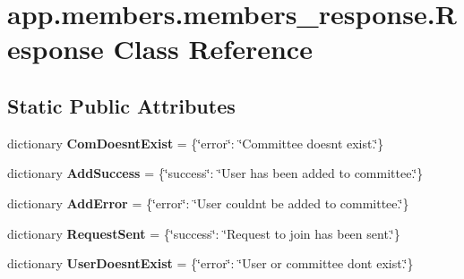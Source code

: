 \hypertarget{classapp_1_1members_1_1members__response_1_1_response}{}\section{app.\+members.\+members\+\_\+response.\+Response Class Reference}
\label{classapp_1_1members_1_1members__response_1_1_response}
\subsection*{Static Public Attributes}
\begin{DoxyCompactItemize}
\item 
\mbox{\label{classapp_1_1members_1_1members__response_1_1_response_a804057619dc394cad0e5e299cc8667de}} 
dictionary {\bfseries Com\+Doesnt\+Exist} = \{\char`\"{}error\char`\"{}\+: \char`\"{}Committee doesn\textquotesingle{}t exist.\char`\"{}\}
\item 
\mbox{\label{classapp_1_1members_1_1members__response_1_1_response_a5c4e309b37b57732bca7dca1b3e315f3}} 
dictionary {\bfseries Add\+Success} = \{\char`\"{}success\char`\"{}\+: \char`\"{}User has been added to committee.\char`\"{}\}
\item 
\mbox{\label{classapp_1_1members_1_1members__response_1_1_response_ab0f06bed80173e3f95ede1a6c356aee8}} 
dictionary {\bfseries Add\+Error} = \{\char`\"{}error\char`\"{}\+: \char`\"{}User couldn\textquotesingle{}t be added to committee.\char`\"{}\}
\item 
\mbox{\label{classapp_1_1members_1_1members__response_1_1_response_aa106df1a989f9e4ac659a3598301bbb9}} 
dictionary {\bfseries Request\+Sent} = \{\char`\"{}success\char`\"{}\+: \char`\"{}Request to join has been sent.\char`\"{}\}
\item 
\mbox{\label{classapp_1_1members_1_1members__response_1_1_response_a490c280d81352928aed2f9acf843819d}} 
dictionary {\bfseries User\+Doesnt\+Exist} = \{\char`\"{}error\char`\"{}\+: \char`\"{}User or committee don\textquotesingle{}t exist.\char`\"{}\}

\end{DoxyCompactItemize}
